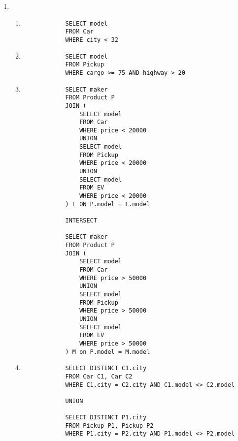 \documentclass[12pt,letterpaper]{article}
\begin{document}
\begin{enumerate}
    \item
      \begin{enumerate}
        \item
          \begin{verbatim}
            SELECT model
            FROM Car
            WHERE city < 32
          \end{verbatim}
        \item
          \begin{verbatim}
            SELECT model
            FROM Pickup
            WHERE cargo >= 75 AND highway > 20
          \end{verbatim}
        \item
          \begin{verbatim}
            SELECT maker
            FROM Product P
            JOIN (
                SELECT model
                FROM Car
                WHERE price < 20000
                UNION
                SELECT model
                FROM Pickup
                WHERE price < 20000
                UNION
                SELECT model
                FROM EV
                WHERE price < 20000
            ) L ON P.model = L.model

            INTERSECT

            SELECT maker
            FROM Product P
            JOIN (
                SELECT model
                FROM Car
                WHERE price > 50000
                UNION
                SELECT model
                FROM Pickup
                WHERE price > 50000
                UNION
                SELECT model
                FROM EV
                WHERE price > 50000
            ) M on P.model = M.model
          \end{verbatim}

        \item
          \begin{verbatim}
            SELECT DISTINCT C1.city
            FROM Car C1, Car C2
            WHERE C1.city = C2.city AND C1.model <> C2.model

            UNION

            SELECT DISTINCT P1.city
            FROM Pickup P1, Pickup P2
            WHERE P1.city = P2.city AND P1.model <> P2.model
          \end{verbatim}
      \end{enumerate}
  \end{enumerate}
\end{document}
